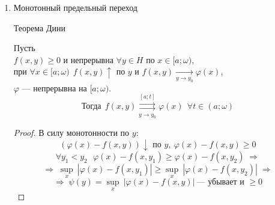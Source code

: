 \begin{properties}
\begin{enumerate}
\begin{proof}
\begin{enumerate}
            \item Покажем, что $\left| \int\limits_{a}^{\omega} f(x, y)\,dx - \int\limits_{a}^{\omega} \varphi(x)\,dx \right|
            \xrightarrow[y \to y_0]{} 0$:
            \[ \left| \int\limits_{a}^{\omega} f(x, y)\,dx - \int\limits_{a}^{\omega} \varphi(x)\,dx \right| \le 
            \underset{< \text{\large$\frac{\varepsilon}{3}$} \ \begin{array}{l} \forall t \in U(\omega) \\[-7 pt] 
            \forall y \in H \end{array}}{\underbrace{\left| \int\limits_{a}^{\omega} f(x, y)\,dx - \int\limits_{a}^{t} f(x, y)\,dx \right|}} + \]
            \[ + \underset{< \text{\large$\frac{\varepsilon}{3}$} \ \begin{array}{c} 
            \text{\footnotesize При фикс. } t \in U(\omega) \\[-7 pt] |y - y_0| < \delta \end{array}}
            {\underbrace{\left| \int\limits_{a}^{t} f(x, y)\,dx - \int\limits_{a}^{t} \varphi(x)\,dx \right|}} + 
            \underset{< \text{\large$\frac{\varepsilon}{3}$} \ \displaystyle\forall t \in U(\omega)}
            {\underbrace{\left| \int\limits_{a}^{t} \varphi(x)\,dx - \int\limits_{a}^{\omega} \varphi(x)\,dx \right|}} < \varepsilon \ \ 
            \forall \varepsilon > 0, \ \ \text{что и требовалось} \]
        \end{enumerate}
        \end{proof}
        
        \item Монотонный предельный переход
        
        \begin{theorem*} Теорема Дини
        
            Пусть \\
            \phantom{Пусть} $f(x, y) \ge 0$ и непрерывна $\forall y \in H$ по $x \in [a; \omega)$, \\
            \phantom{Пусть} при $\forall x \in [a; \omega) \ \ f(x, y) \uparrow$ по $y$ и $f(x, y) \xrightarrow[y \to y_0]{} \varphi(x)$, \\
            \phantom{Пусть} $\varphi$ --- непрерывна на $[a; \omega)$.
            \[ \text{Тогда} \ \ f(x, y) \overset{[a; t]}{\underset{y \to y_0}{\rightrightarrows}} \varphi(x) \ \ \forall t \in (a; \omega) \]
        \end{theorem*}
        \begin{proof}
            В силу монотонности по $y$:
            \[ (\varphi(x) - f(x, y)) \downarrow \text{ по } y, \ \varphi(x) - f(x, y) \ge 0 \]
            \[ \forall y_1 < y_2 \ \ \ \varphi(x) - f(x, y_1) \ge \varphi(x) - f(x, y_2) \;\Rightarrow \]
            \[ \Rightarrow\; \underset{x}{\sup}\:\left| \varphi(x) - f(x, y_1) \right| \ge 
            \underset{x}{\sup}\:\left| \varphi(x) - f(x, y_2) \right| \;\Rightarrow \]
            \[ \Rightarrow\; \psi(y) = \underset{x}{\sup}\:\left| \varphi(x) - f(x, y) \right| \ \text{--- убывает и } \ge 0 \]
            

\end{proof}
\end{enumerate}
\end{properties}
